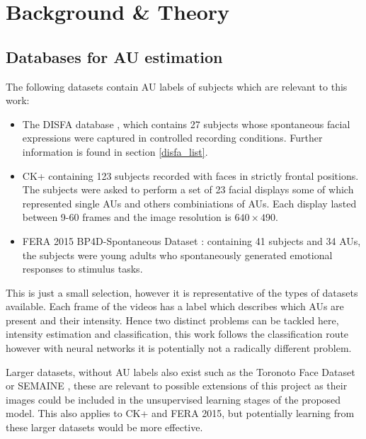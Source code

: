 \chapter{Background \& Theory}
  \section{Databases for AU estimation}
    The following datasets contain AU labels of subjects which are relevant to this work:

    \begin{itemize}
        \item The DISFA database \cite{disfa}, which contains 27 subjects whose spontaneous
              facial expressions were captured in controlled recording conditions. Further information is found in section \ref{disfa_list}.
        \item CK+ \cite{Lucey2010} containing 123 subjects recorded with faces in strictly frontal positions. The subjects were asked to perform a set of
              23 facial displays some of which represented single AUs and others combiniations of AUs. Each display lasted between 9-60 frames
              and the image resolution is $640\times 490$.
        \item FERA 2015 BP4D-Spontaneous Dataset \cite{Valstar}:
              containing 41 subjects and 34 AUs, the subjects were young adults who
              spontaneously generated emotional responses to stimulus tasks.
    \end{itemize}

    This is just a small selection, however it is representative of the types of
    datasets available. Each frame of the videos has a label which describes which AUs are
    present and their intensity. Hence two distinct problems can be tackled here, intensity
    estimation and classification, this work follows the classification route however
    with neural networks it is potentially not a radically different problem.

    Larger datasets, without AU labels also exist such as the Toronoto Face Dataset\cite{tfd}
    or SEMAINE \cite{semaine}, these are relevant to possible extensions of this project as their
    images could be included in the unsupervised learning stages of the proposed model. This also
    applies to CK+ and FERA 2015, but potentially learning from these larger datasets would
    be more effective.

